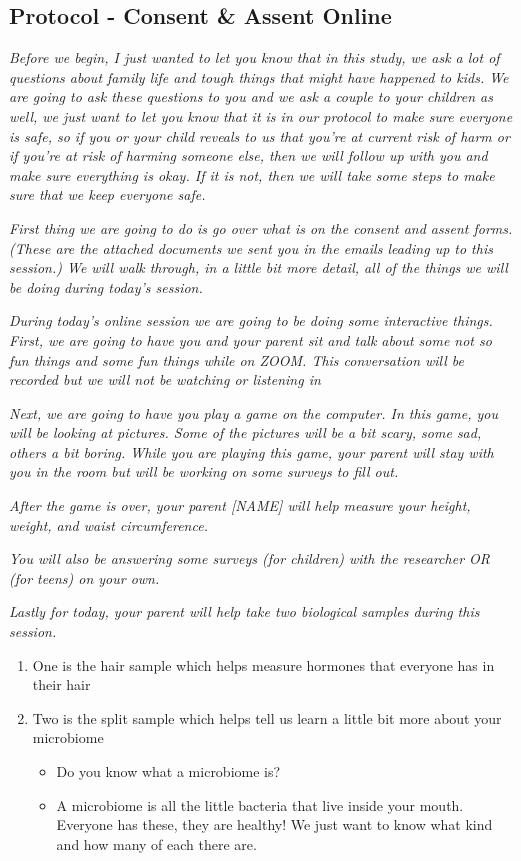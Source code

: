 \documentclass[]{book}
\begin{document}
\hypertarget{protocol---consent-assent-online-1}{%
\subsection{Protocol - Consent \& Assent Online}\label{protocol---consent-assent-online-1}}

\emph{Before we begin, I just wanted to let you know that in this study, we ask a lot of questions about family life and tough things that might have happened to kids. We are going to ask these questions to you and we ask a couple to your children as well, we just want to let you know that it is in our protocol to make sure everyone is safe, so if you or your child reveals to us that you're at current risk of harm or if you're at risk of harming someone else, then we will follow up with you and make sure everything is okay. If it is not, then we will take some steps to make sure that we keep everyone safe.}

\emph{First thing we are going to do is go over what is on the consent and assent forms. (These are the attached documents we sent you in the emails leading up to this session.) We will walk through, in a little bit more detail, all of the things we will be doing during today's session.}

\emph{During today's online session we are going to be doing some interactive things. First, we are going to have you and your parent sit and talk about some not so fun things and some fun things while on ZOOM. This conversation will be recorded but we will not be watching or listening in}

\emph{Next, we are going to have you play a game on the computer. In this game, you will be looking at pictures. Some of the pictures will be a bit scary, some sad, others a bit boring. While you are playing this game, your parent will stay with you in the room but will be working on some surveys to fill out.}

\emph{After the game is over, your parent {[}NAME{]} will help measure your height, weight, and waist circumference.}

\emph{You will also be answering some surveys (for children) with the researcher OR (for teens) on your own.}

\emph{Lastly for today, your parent will help take two biological samples during this session.}

\begin{enumerate}
\def\labelenumi{\arabic{enumi}.}
\item
  One is the hair sample which helps measure hormones that everyone has in their hair
\item
  Two is the split sample which helps tell us learn a little bit more about your microbiome

  \begin{itemize}
  \item
    Do you know what a microbiome is?
  \item
    A microbiome is all the little bacteria that live inside your mouth. Everyone has these, they are healthy! We just want to know what kind and how many of each there are.
  \end{itemize}
\end{enumerate}
\end{document}
